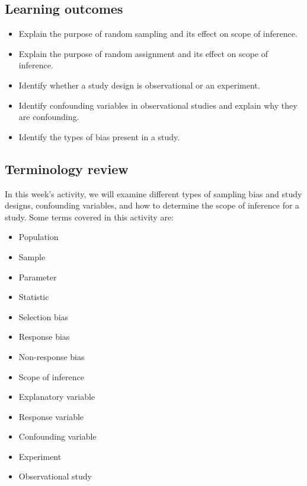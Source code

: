 \documentclass[
]{report}
\begin{document}

\hypertarget{learning-outcomes-1}{%
\subsection{Learning outcomes}\label{learning-outcomes-1}}

\begin{itemize}
\item
  Explain the purpose of random sampling and its effect on scope of inference.
\item
  Explain the purpose of random assignment and its effect on scope of inference.
\item
  Identify whether a study design is observational or an experiment.
\item
  Identify confounding variables in observational studies and explain why they are confounding.
\item
  Identify the types of bias present in a study.
\end{itemize}

\hypertarget{terminology-review-1}{%
\subsection{Terminology review}\label{terminology-review-1}}

In this week's activity, we will examine different types of sampling bias and study designs, confounding variables, and how to determine the scope of inference for a study. Some terms covered in this activity are:

\begin{itemize}
\item
  Population
\item
  Sample
\item
  Parameter
\item
  Statistic
\item
  Selection bias
\item
  Response bias
\item
  Non-response bias
\item
  Scope of inference
\item
  Explanatory variable
\item
  Response variable
\item
  Confounding variable
\item
  Experiment
\item
  Observational study
\end{itemize}
\end{document}
